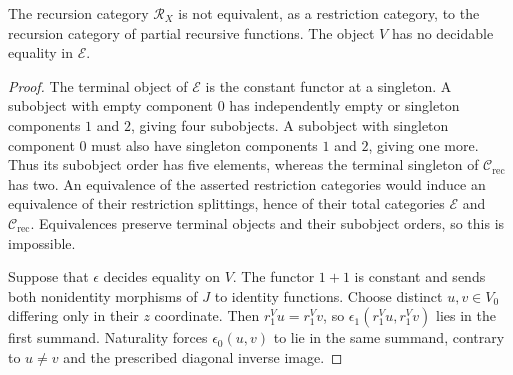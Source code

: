 \begin{proposition}\label{prop:fork-distinction}
The recursion category $\mathscr R_X$ is not equivalent, as a
restriction category, to the recursion category of partial recursive functions.
The object $V$ has no decidable equality in $\mathcal E$.
\end{proposition}
\begin{proof}
The terminal object of $\mathcal E$ is the constant functor at a singleton.
A subobject with empty component $0$ has independently empty or
singleton components $1$ and $2$, giving four subobjects. A
subobject with singleton component $0$ must also have singleton
components $1$ and $2$, giving one more. Thus its subobject order has five elements, whereas
the terminal singleton of $\mathcal C_{\mathrm{rec}}$ has two.
An equivalence of the asserted restriction categories would induce
an equivalence of their restriction splittings, hence of their
total categories $\mathcal E$ and $\mathcal C_{\mathrm{rec}}$.
Equivalences preserve terminal objects and their subobject orders,
so this is impossible.

Suppose that $\epsilon$ decides equality on $V$. The functor $1+1$
is constant and sends both nonidentity morphisms of $J$ to
identity functions. Choose distinct $u,v\in V_0$ differing only
in their $z$ coordinate. Then $r_1^Vu=r_1^Vv$, so
$\epsilon_1(r_1^Vu,r_1^Vv)$ lies in the first summand.
Naturality forces $\epsilon_0(u,v)$ to lie in the same summand,
contrary to $u\ne v$ and the prescribed diagonal inverse image.
\end{proof}

